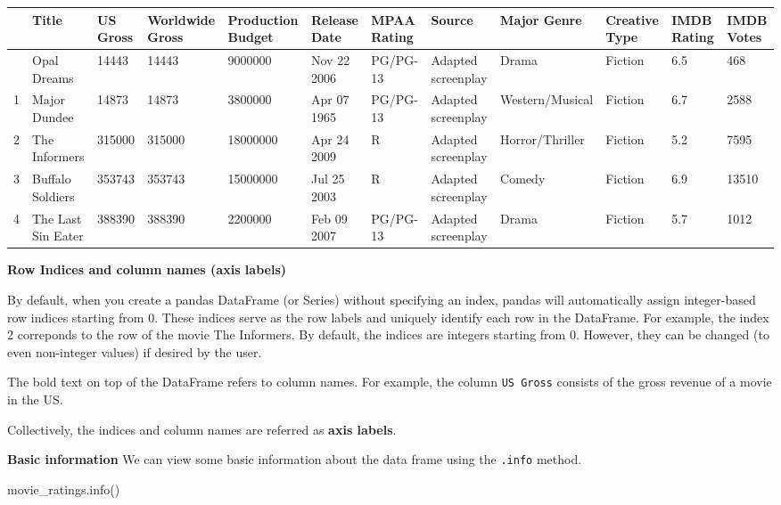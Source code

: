\documentclass[
  letterpaper,
  DIV=11,
  numbers=noendperiod]{scrreprt}
\newenvironment{Shaded}{\begin{snugshade}}{\end{snugshade}}
\newcommand{\NormalTok}[1]{\textcolor[rgb]{0.00,0.23,0.31}{#1}}
\begin{document}
\begin{longtable}[]{@{}llllllllllll@{}}
\toprule\noalign{}
& Title & US Gross & Worldwide Gross & Production Budget & Release Date
& MPAA Rating & Source & Major Genre & Creative Type & IMDB Rating &
IMDB Votes \\
\midrule\noalign{}
\endhead
\bottomrule\noalign{}
\endlastfoot
0 & Opal Dreams & 14443 & 14443 & 9000000 & Nov 22 2006 & PG/PG-13 &
Adapted screenplay & Drama & Fiction & 6.5 & 468 \\
1 & Major Dundee & 14873 & 14873 & 3800000 & Apr 07 1965 & PG/PG-13 &
Adapted screenplay & Western/Musical & Fiction & 6.7 & 2588 \\
2 & The Informers & 315000 & 315000 & 18000000 & Apr 24 2009 & R &
Adapted screenplay & Horror/Thriller & Fiction & 5.2 & 7595 \\
3 & Buffalo Soldiers & 353743 & 353743 & 15000000 & Jul 25 2003 & R &
Adapted screenplay & Comedy & Fiction & 6.9 & 13510 \\
4 & The Last Sin Eater & 388390 & 388390 & 2200000 & Feb 09 2007 &
PG/PG-13 & Adapted screenplay & Drama & Fiction & 5.7 & 1012 \\
\end{longtable}

\textbf{Row Indices and column names (axis labels)}

By default, when you create a pandas DataFrame (or Series) without
specifying an index, pandas will automatically assign integer-based row
indices starting from 0. These indices serve as the row labels and
uniquely identify each row in the DataFrame. For example, the index 2
correponds to the row of the movie The Informers. By default, the
indices are integers starting from 0. However, they can be changed (to
even non-integer values) if desired by the user.

The bold text on top of the DataFrame refers to column names. For
example, the column \texttt{US\ Gross} consists of the gross revenue of
a movie in the US.

Collectively, the indices and column names are referred as \textbf{axis
labels}.

\textbf{Basic information} We can view some basic information about the
data frame using the \texttt{.info} method.

\begin{Shaded}
\begin{Highlighting}[]
\NormalTok{movie\_ratings.info()}
\end{Highlighting}
\end{Shaded}
\end{document}
